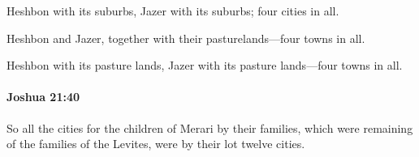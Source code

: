 			\begin{versebox}
					\item[BHS] 
					\item[ASV] Heshbon with its suburbs, Jazer with its suburbs; four cities in all.
					\item[NIV] Heshbon and Jazer, together with their pasturelands—four towns in all.
					\item[NRSV] Heshbon with its pasture lands, Jazer with its pasture lands—four towns in all.
			\end{versebox}

		\paragraph{Joshua 21:40} %
			\label{JOSHUA-21-40}

			So all the cities for the children of Merari by their families, which were remaining of the families of the Levites, were by their lot twelve cities.

